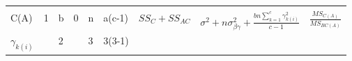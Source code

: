\documentclass[12pt,]{article}
\begin{document}
\begin{longtable}[]{@{}lllllllll@{}}
\begin{minipage}[t]{0.09\columnwidth}
\strut
\end{minipage}\tabularnewline
\begin{minipage}[t]{0.06\columnwidth}\raggedright
C(A)\strut
\end{minipage} & \begin{minipage}[t]{0.03\columnwidth}\raggedright
1\strut
\end{minipage} & \begin{minipage}[t]{0.03\columnwidth}\raggedright
b\strut
\end{minipage} & \begin{minipage}[t]{0.03\columnwidth}\raggedright
0\strut
\end{minipage} & \begin{minipage}[t]{0.03\columnwidth}\raggedright
n\strut
\end{minipage} & \begin{minipage}[t]{0.12\columnwidth}\raggedright
a(c-1)\strut
\end{minipage} & \begin{minipage}[t]{0.15\columnwidth}\raggedright
\(SS_C+SS_{AC}\)\strut
\end{minipage} & \begin{minipage}[t]{0.21\columnwidth}\raggedright
\(\sigma^2+n\sigma^2_{\beta\gamma}+\frac{bn\sum\limits_{k=1}^c\gamma_{k(i)}^2}{c-1}\)\strut
\end{minipage} & \begin{minipage}[t]{0.09\columnwidth}\raggedright
\(\frac{MS_{C(A)}}{MS_{BC(A)}}\)\strut
\end{minipage}\tabularnewline
\begin{minipage}[t]{0.06\columnwidth}\raggedright
\(\gamma_{k(i)}\)\strut
\end{minipage} & \begin{minipage}[t]{0.03\columnwidth}\raggedright
\strut
\end{minipage} & \begin{minipage}[t]{0.03\columnwidth}\raggedright
2\strut
\end{minipage} & \begin{minipage}[t]{0.03\columnwidth}\raggedright
\strut
\end{minipage} & \begin{minipage}[t]{0.03\columnwidth}\raggedright
3\strut
\end{minipage} & \begin{minipage}[t]{0.12\columnwidth}\raggedright
3(3-1)\strut
\end{minipage} & \begin{minipage}[t]{0.15\columnwidth}\raggedright

\end{minipage}
\end{longtable}
\end{document}
